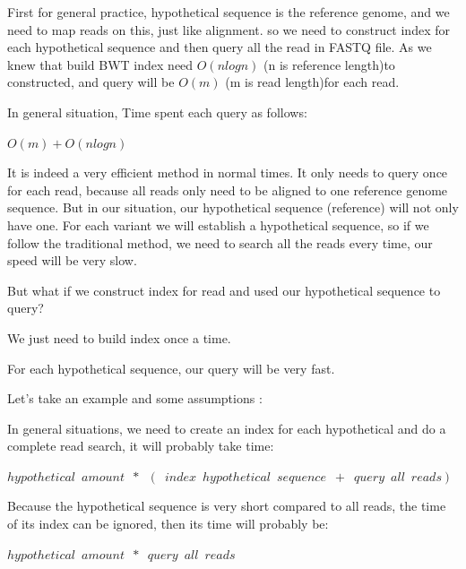 First for general practice, hypothetical sequence is the reference genome, and we need to map reads on this, just like alignment. so we need to construct index for each hypothetical sequence and then query all the read in FASTQ file. As we knew that build BWT index need $O(nlogn)$  (n is reference length)to constructed, and query will be $O(m)$ (m is read length)for each read.
\begin{flushleft}
In general situation, Time spent each query as follows: 
\end{flushleft} 
\begin{center}
    $O(m)+O(nlogn)$
\end{center}  

It is indeed a very efficient method in normal times. It only needs to query once for each read, because all reads only need to be aligned to one reference genome sequence. But in our situation, our hypothetical sequence (reference) will not only have one. For each variant we will establish a hypothetical sequence, so if we follow the traditional method, we need to search all the reads every time, our speed will be very slow.

But what if we construct index for read and used our hypothetical sequence to query?
\begin{enumerate}
{
    \item We just need to build index once a time.
    \item For each hypothetical sequence, our query will be very fast.
}
\end{enumerate}

\begin{flushleft}
Let’s take an example and some assumptions :
\end{flushleft}

In general situations, we need to create an index for each hypothetical and do a complete read search, it will probably take time:
\begin{center}
    $hypothetical\enspace amount\enspace*\enspace(\enspace index\enspace hypothetical\enspace sequence\enspace+\enspace query\enspace all\enspace reads)$
\end{center}  
\begin{flushleft}
Because the hypothetical sequence is very short compared to all reads, the time of its index can be ignored, then its time will probably be:
\end{flushleft}
\begin{center}
    $hypothetical\enspace amount\enspace*\enspace query\enspace all\enspace reads$
\end{center}  

